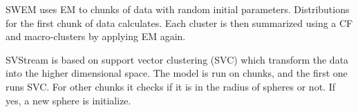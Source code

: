 \documentclass[../UNBThesis2.tex]{subfiles}
\begin{document}
\begin{itemize}
SWEM \cite{dang2009based} uses EM to chunks of data with random initial parameters. Distributions for the first chunk of data calculates. Each cluster is then summarized using a CF and macro-clusters by applying EM again.

SVStream \cite{wang2011svstream} is based on support vector clustering (SVC) which transform the data into the higher dimensional space. The model is run on chunks, and the first one runs SVC. For other chunks it checks if it is in the radius of spheres or not. If yes, a new sphere is initialize. 






\end{itemize}





   	    

         

\end{document}
